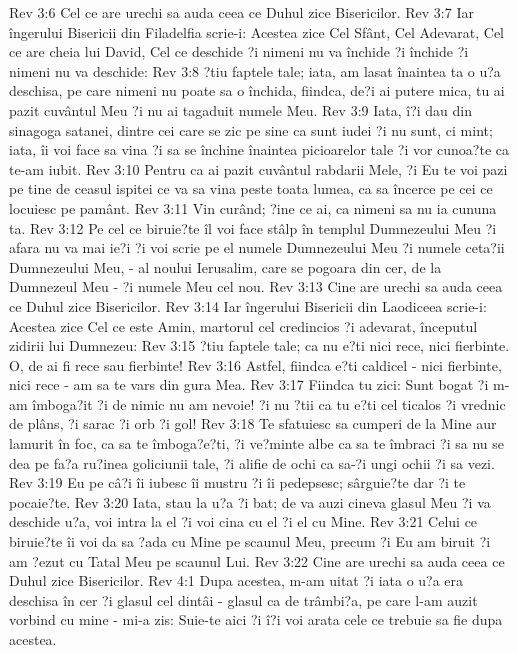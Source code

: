 Rev 3:6  Cel ce are urechi sa auda ceea ce Duhul zice Bisericilor.
Rev 3:7  Iar îngerului Bisericii din Filadelfia scrie-i: Acestea zice Cel Sfânt, Cel Adevarat, Cel ce are cheia lui David, Cel ce deschide ?i nimeni nu va închide ?i închide ?i nimeni nu va deschide:
Rev 3:8  ?tiu faptele tale; iata, am lasat înaintea ta o u?a deschisa, pe care nimeni nu poate sa o închida, fiindca, de?i ai putere mica, tu ai pazit cuvântul Meu ?i nu ai tagaduit numele Meu.
Rev 3:9  Iata, î?i dau din sinagoga satanei, dintre cei care se zic pe sine ca sunt iudei ?i nu sunt, ci mint; iata, îi voi face sa vina ?i sa se închine înaintea picioarelor tale ?i vor cunoa?te ca te-am iubit.
Rev 3:10  Pentru ca ai pazit cuvântul rabdarii Mele, ?i Eu te voi pazi pe tine de ceasul ispitei ce va sa vina peste toata lumea, ca sa încerce pe cei ce locuiesc pe pamânt.
Rev 3:11  Vin curând; ?ine ce ai, ca nimeni sa nu ia cununa ta.
Rev 3:12  Pe cel ce biruie?te îl voi face stâlp în templul Dumnezeului Meu ?i afara nu va mai ie?i ?i voi scrie pe el numele Dumnezeului Meu ?i numele ceta?ii Dumnezeului Meu, - al noului Ierusalim, care se pogoara din cer, de la Dumnezeul Meu - ?i numele Meu cel nou.
Rev 3:13  Cine are urechi sa auda ceea ce Duhul zice Bisericilor.
Rev 3:14  Iar îngerului Bisericii din Laodiceea scrie-i: Acestea zice Cel ce este Amin, martorul cel credincios ?i adevarat, începutul zidirii lui Dumnezeu:
Rev 3:15  ?tiu faptele tale; ca nu e?ti nici rece, nici fierbinte. O, de ai fi rece sau fierbinte!
Rev 3:16  Astfel, fiindca e?ti caldicel - nici fierbinte, nici rece - am sa te vars din gura Mea.
Rev 3:17  Fiindca tu zici: Sunt bogat ?i m-am îmboga?it ?i de nimic nu am nevoie! ?i nu ?tii ca tu e?ti cel ticalos ?i vrednic de plâns, ?i sarac ?i orb ?i gol!
Rev 3:18  Te sfatuiesc sa cumperi de la Mine aur lamurit în foc, ca sa te îmboga?e?ti, ?i ve?minte albe ca sa te îmbraci ?i sa nu se dea pe fa?a ru?inea goliciunii tale, ?i alifie de ochi ca sa-?i ungi ochii ?i sa vezi.
Rev 3:19  Eu pe câ?i îi iubesc îi mustru ?i îi pedepsesc; sârguie?te dar ?i te pocaie?te.
Rev 3:20  Iata, stau la u?a ?i bat; de va auzi cineva glasul Meu ?i va deschide u?a, voi intra la el ?i voi cina cu el ?i el cu Mine.
Rev 3:21  Celui ce biruie?te îi voi da sa ?ada cu Mine pe scaunul Meu, precum ?i Eu am biruit ?i am ?ezut cu Tatal Meu pe scaunul Lui.
Rev 3:22  Cine are urechi sa auda ceea ce Duhul zice Bisericilor.
Rev 4:1  Dupa acestea, m-am uitat ?i iata o u?a era deschisa în cer ?i glasul cel dintâi - glasul ca de trâmbi?a, pe care l-am auzit vorbind cu mine - mi-a zis: Suie-te aici ?i î?i voi arata cele ce trebuie sa fie dupa acestea.
